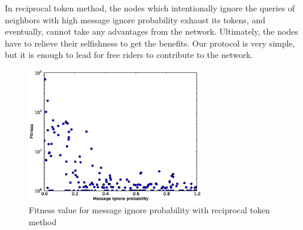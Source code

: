 \documentclass[12pt,journal,draftcls,letterpaper,onecolumn]{IEEEtran}
\begin{document}
In reciprocal token method, the nodes which intentionally ignore the queries of neighbors
with high message ignore probability exhaust its tokens, and eventually, cannot take any
advantages from the network. Ultimately, the nodes have to relieve their selfishness to get the
benefits. Our protocol is very simple, but it is enough to lead for free riders to contribute to
the network.

\begin{figure}
\centering
\includegraphics[width=3in]{fitness2}
\caption{Fitness value for message ignore probability with reciprocal token method}
\label{fig:tokenfit}
\end{figure}
\end{document}
